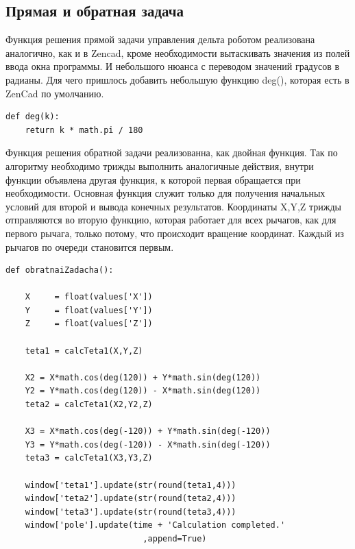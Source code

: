 \subsection{Прямая и обратная задача}

Функция решения прямой задачи управления дельта роботом реализована аналогично, как и в Zencad, кроме необходимости вытаскивать значения из полей ввода окна программы. И небольшого нюанса с переводом значений градусов в радианы. Для чего пришлось добавить небольшую функцию deg(), которая есть в ZenCad по умолчанию. 

\begin{lstlisting}[style=python,caption=Функция перевода градусов в радианы]
def deg(k):
    return k * math.pi / 180
\end{lstlisting}


Функция решения обратной задачи реализованна, как двойная функция. Так по алгоритму необходимо трижды выполнить аналогичные действия, внутри функции объявлена другая функция, к которой первая обращается при необходимости. Основная функция служит только для получения начальных условий для второй и вывода конечных результатов. Координаты X,Y,Z трижды отправляются во вторую функцию, которая работает для всех рычагов, как для первого рычага, только потому, что происходит вращение координат. Каждый из рычагов по очереди становится первым.

\begin{lstlisting}[style=python,caption=Основная функция обратной задачи]
def obratnaiZadacha():

    X     = float(values['X'])
    Y     = float(values['Y'])
    Z     = float(values['Z'])

    teta1 = calcTeta1(X,Y,Z)

    X2 = X*math.cos(deg(120)) + Y*math.sin(deg(120))
    Y2 = Y*math.cos(deg(120)) - X*math.sin(deg(120))
    teta2 = calcTeta1(X2,Y2,Z)

    X3 = X*math.cos(deg(-120)) + Y*math.sin(deg(-120))
    Y3 = Y*math.cos(deg(-120)) - X*math.sin(deg(-120))
    teta3 = calcTeta1(X3,Y3,Z)

    window['teta1'].update(str(round(teta1,4)))
    window['teta2'].update(str(round(teta2,4)))
    window['teta3'].update(str(round(teta3,4)))
    window['pole'].update(time + 'Calculation completed.'
                            ,append=True)

\end{lstlisting}

